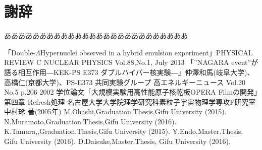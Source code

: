 \documentclass[12pt,a4paper]{jarticle}
\begin{document}
\section*{謝辞}
ああああああああああああああああああああああああああ
\begin{thebibliography}{99}
 「Double-$\Lambda$Hypernuclei observed in a hybrid emulsion experiment」PHYSICAL REVIEW C NUCLEAR PHYSICS Vol.88,No.1, July 2013
 「”NAGARA event”が語る相互作用―KEK-PS E373 ダブルハイパー核実験―」仲澤和馬(岐阜大学)、高橋仁(京都大学)、PS-E373 共同実験グループ 高エネルギーニュース Vol.20 No.5 p.206 2002
 学位論文「大規模実験用高性能原子核乾板OPERA Filmの開発」第四章 Refresh処理 名古屋大学大学院理学研究科素粒子宇宙物理学専攻F研究室 中村琢 著(2005年)
 M.Ohashi,Graduation.Thesis,Gifu University (2015).
 N.Muramoto,Graduation.Thesis,Gifu University (2016).
 K.Tamura,,Graduation.Thesis,Gifu University (2015).
 Y.Endo,Master.Thesis, Gifu University (2016).
 D.Daisuke,Master.Thesis, Gifu University (2016).
\end{thebibliography}
\end{document}
